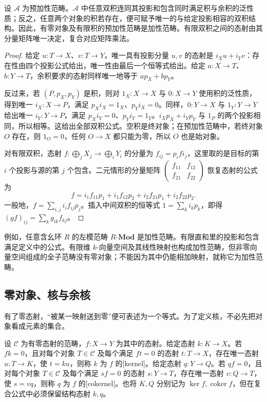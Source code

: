 \begin{proposition}\label{b4:prop:biproduct-calculus}
	设 \(\mathcal A\) 为预加性范畴。\(\mathcal A\) 中任意双积连同其投影和包含同时满足积与余积的泛性质；反之，任意两个对象的积若存在，便可赋予唯一的与给定投影相容的双积结构。因此，有零对象及有限积的预加性范畴是加性范畴。有限双积之间的态射由其分量矩阵唯一决定，复合对应矩阵乘法。
\end{proposition}
\begin{proof}
	给定 \(u:T\to X\)、\(v:T\to Y\)，唯一具有投影分量 \(u,v\) 的态射是 \(i_Xu+i_Yv\)：存在性由四个投影公式给出，唯一性由最后一个恒等式给出。给定 \(a:X\to T\)、\(b:Y\to T\)，余积要求的态射同样唯一地等于 \(ap_X+bp_Y\)。

	反过来，若 \((P,p_X,p_Y)\) 是积，则对 \(1_X:X\to X\) 与 \(0:X\to Y\) 使用积的泛性质，得到唯一 \(i_X:X\to P\)，满足 \(p_Xi_X=1_X\)、\(p_Yi_X=0\)。同样，\(0:Y\to X\) 与 \(1_Y:Y\to Y\) 给出唯一 \(i_Y:Y\to P\)，满足 \(p_Xi_Y=0\)、\(p_Yi_Y=1_Y\)。\(i_Xp_X+i_Yp_Y\) 与 \(1_P\) 的两个投影相同，所以相等。这给出全部双积公式。空积是终对象；在预加性范畴中，若终对象 \(O\) 存在，则 \(1_O=0\)，任何 \(O\to X\) 都只能为零，所以 \(O\) 也是始对象。

	对有限双积，态射 \(f:\bigoplus_jX_j\to\bigoplus_iY_i\) 的分量为 \(f_{ij}=p_if i_j\)，这里取的是目标的第 \(i\) 个投影与源的第 \(j\) 个包含。二元情形的分量矩阵 \(\begin{pmatrix}f_{11}&f_{12}\\f_{21}&f_{22}\end{pmatrix}\) 恢复态射的公式为
	\[
		f=i_1f_{11}p_1+i_1f_{12}p_2+i_2f_{21}p_1+i_2f_{22}p_2.
	\]
	一般地，\(f=\sum_{i,j}i_if_{ij}p_j\)。插入中间双积的恒等式 \(1=\sum_k i_kp_k\)，即得 \((gf)_{ij}=\sum_k g_{ik}f_{kj}\)。
\end{proof}

例如，任意含幺环 \(R\) 的左模范畴 \(R\text{-}\mathbf{Mod}\) 是加性范畴。有限直和里的投影和包含满足定义中的公式。有限维 \(k\)-向量空间及其线性映射也构成加性范畴，但非零向量空间组成的全子范畴没有零对象；不能因为其中仍能相加映射，就称它为加性范畴。

\subsection{零对象、核与余核}
\label{b4:subsec:0401:02}

有了零态射，“被某一映射送到零”便可表述为一个等式。为了定义核，不必先把对象看成元素的集合。

\begin{definition}\label{b4:def:kernel-cokernel}
	设 \(\mathcal C\) 为有零态射的范畴，\(f:X\to Y\) 为其中的态射。给定态射 \(k:K\to X\)。若 \(fk=0\)，且对每个对象 \(T\in\mathcal C\) 及每个满足 \(ft=0\) 的态射 \(t:T\to X\)，存在唯一态射 \(u:T\to K\)，使 \(t=ku\)，则称 \(k\) 为 \(f\) 的[kernel]。给定态射 \(q:Y\to Q\)。若 \(qf=0\)，且对每个对象 \(T\in\mathcal C\) 及每个满足 \(sf=0\) 的态射 \(s:Y\to T\)，存在唯一态射 \(v:Q\to T\)，使 \(s=vq\)，则称 \(q\) 为 \(f\) 的[cokernel]。也将 \(K,Q\) 分别记为 \(\ker f,\operatorname{coker}f\)，但在复合公式中必须保留结构态射 \(k,q\)。
\end{definition}

